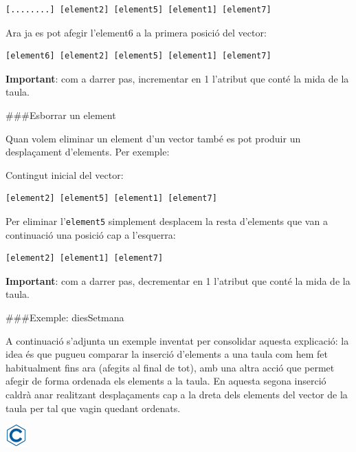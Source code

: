 \documentclass[]{book}
\begin{document}
\begin{verbatim}
[........] [element2] [element5] [element1] [element7]
\end{verbatim}

Ara ja es pot afegir l'element6 a la primera posició del vector:

\begin{verbatim}
[element6] [element2] [element5] [element1] [element7]
\end{verbatim}

\textbf{Important}: com a darrer pas, incrementar en 1 l'atribut que conté la mida de la taula.

\#\#\#Esborrar un element

Quan volem eliminar un element d'un vector també es pot produir un desplaçament d'elements. Per exemple:

Contingut inicial del vector:

\begin{verbatim}
[element2] [element5] [element1] [element7]
\end{verbatim}

Per eliminar l'\texttt{element5} simplement desplacem la resta d'elements que van a continuació una posició cap a l'esquerra:

\begin{verbatim}
[element2] [element1] [element7]
\end{verbatim}

\textbf{Important}: com a darrer pas, decrementar en 1 l'atribut que conté la mida de la taula.

\#\#\#Exemple: diesSetmana

A continuació s'adjunta un exemple inventat per consolidar aquesta explicació: la idea és que pugueu comparar la inserció d'elements a una taula com hem fet habitualment fins ara (afegits al final de tot), amb una altra acció que permet afegir de forma ordenada els elements a la taula. En aquesta segona inserció caldrà anar realitzant desplaçaments cap a la dreta dels elements del vector de la taula per tal que vagin quedant ordenats.

\includegraphics{./img/c.png}
\end{document}

